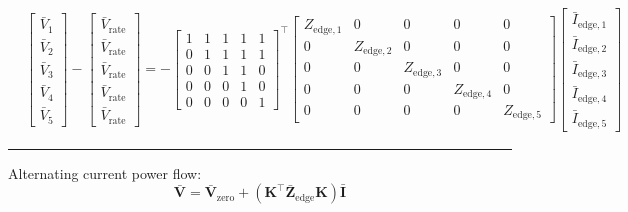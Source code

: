 \documentclass[
]{book}
\begin{document}
\[ \begin{aligned}
  &
  \left[\begin{array}{c}
    \bar{V}_{1} \\
    \bar{V}_{2} \\
    \bar{V}_{3} \\
    \bar{V}_{4} \\
    \bar{V}_{5}
  \end{array}\right]
  -
  \left[\begin{array}{c}
    \bar{V}_\text{rate} \\
    \bar{V}_\text{rate} \\
    \bar{V}_\text{rate} \\
    \bar{V}_\text{rate} \\
    \bar{V}_\text{rate}
  \end{array}\right]
  =
  - \left[\begin{array}{ccccc}
    1 & 1 & 1 & 1 & 1 \\ 
    0 & 1 & 1 & 1 & 1 \\ 
    0 & 0 & 1 & 1 & 0 \\ 
    0 & 0 & 0 & 1 & 0 \\ 
    0 & 0 & 0 & 0 & 1
  \end{array} \right]^{\top}
  \left[\begin{array}{ccccc}
    Z_{\text{edge}, 1} & 0 & 0 & 0 & 0 \\
    0 & Z_{\text{edge}, 2} & 0 & 0 & 0 \\
    0 & 0 & Z_{\text{edge}, 3} & 0 & 0 \\
    0 & 0 & 0 & Z_{\text{edge}, 4} & 0 \\
    0 & 0 & 0 & 0 & Z_{\text{edge}, 5}
  \end{array}\right]
  \left[\begin{array}{l}
    \bar{I}_{\text{edge}, 1} \\
    \bar{I}_{\text{edge}, 2} \\
    \bar{I}_{\text{edge}, 3} \\
    \bar{I}_{\text{edge}, 4} \\
    \bar{I}_{\text{edge}, 5}
  \end{array} \right]
\end{aligned} \]

\begin{center}\rule{0.5\linewidth}{0.5pt}\end{center}

Alternating current power flow: \citep{conti2006voltage}
\[
  \bar{\boldsymbol{V}} = \bar{\boldsymbol{V}}_{\text{zero}}
    + \left( \boldsymbol{K}^{\top} \boldsymbol{\bar{Z}}_\text{edge}
    \boldsymbol{K} \right) \bar{\boldsymbol{I}}
\]
\end{document}
